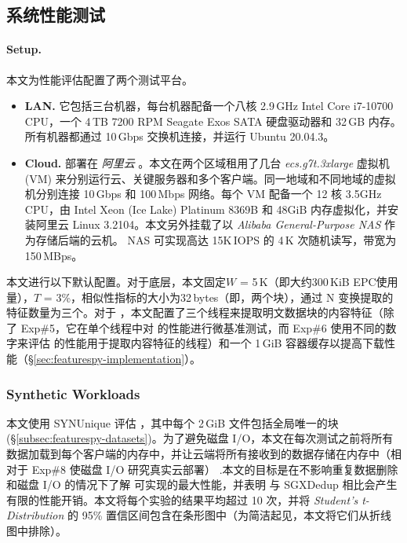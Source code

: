 \subsection{系统性能测试}
\label{subsec:featurespy-evaluation-performance}


\paragraph*{Setup.} 本文为性能评估配置了两个测试平台。

\begin{itemize}[leftmargin=*]
\item {\bf LAN.} 它包括三台机器，每台机器配备一个八核 2.9\,GHz Intel Core i7-10700 CPU，一个 4\,TB 7200 RPM Seagate Exos SATA 硬盘驱动器和 32\,GB 内存。所有机器都通过 10\,Gbps 交换机连接，并运行 Ubuntu 20.04.3。

\item {\bf Cloud.} 部署在 {\em 阿里云} \cite{Alibaba}。本文在两个区域租用了几台 {\em ecs.g7t.3xlarge} 虚拟机 (VM) 来分别运行云、关键服务器和多个客户端。同一地域和不同地域的虚拟机分别连接 10\,Gbps 和 100\,Mbps 网络。每个 VM 配备一个 12 核 3.5GHz CPU，由 Intel Xeon (Ice Lake) Platinum 8369B 和 48GiB 内存虚拟化，并安装阿里云 Linux 3.2104。本文另外挂载了以 {\em Alibaba General-Purpose NAS} 作为存储后端的云机。 NAS 可实现高达 15K\,IOPS 的 4\,K 次随机读写，带宽为 150\,MBps。
\end{itemize}

本文进行以下默认配置。对于底层\sysnameF，本文固定$W$ = 5\,K（即大约300\,KiB EPC使用量），$T$ = 3\%，相似性指标的大小为32\,bytes（即，两个块），通过 N 变换提取的特征数量为三个。对于 \prototype，本文配置了三个线程来提取明文数据块的内容特征（除了 Exp\#5，它在单个线程中对 \prototype 的性能进行微基准测试，而 Exp\#6 使用不同的数字来评估 \prototype 的性能用于提取内容特征的线程）和一个 1\,GiB 容器缓存以提高下载性能（\S\ref{sec:featurespy-implementation}）。

\subsubsection{Synthetic Workloads}
\label{subsec:featurespy-syn}
本文使用 SYNUnique 评估 \prototype，其中每个 2\,GiB 文件包括全局唯一的块 (\S\ref{subsec:featurespy-datasets})。为了避免磁盘 I/O，本文在每次测试之前将所有数据加载到每个客户端的内存中，并让云端将所有接收到的数据存储在内存中（相对于 Exp\#8 使磁盘 I/O 研究真实云部署） .本文的目标是在不影响重复数据删除和磁盘 I/O 的情况下了解 \prototype 可实现的最大性能，并表明 \prototype 与 SGXDedup \cite{ren21} 相比会产生有限的性能开销。本文将每个实验的结果平均超过 10 次，并将 {\em Student's t-Distribution} 的 95\% 置信区间包含在条形图中（为简洁起见，本文将它们从折线图中排除）。

